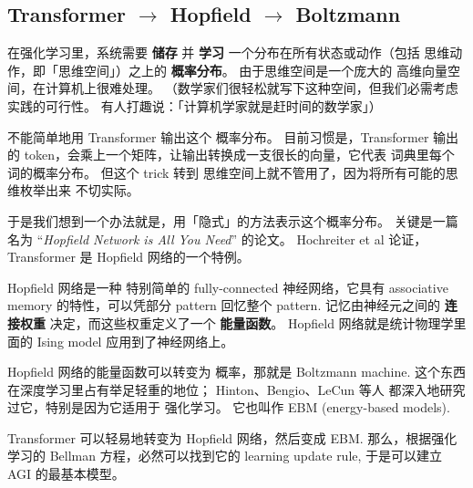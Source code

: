 \begin{preview}
\begin{minipage}{\textwidth}
\subsection[Transformer]{Transformer $\rightarrow$ Hopfield $\rightarrow$ Boltzmann}

在强化学习里，系统需要 \textbf{储存} 并 \textbf{学习} 一个分布在所有状态或动作（包括 思维动作，即「思维空间」）之上的 \textbf{概率分布}。 由于思维空间是一个庞大的 高维向量空间，在计算机上很难处理。 （数学家们很轻松就写下这种空间，但我们必需考虑实践的可行性。 有人打趣说：「计算机学家就是赶时间的数学家」）

不能简单地用 Transformer 输出这个 概率分布。 目前习惯是，Transformer 输出的 token，会乘上一个矩阵，让输出转换成一支很长的向量，它代表 词典里每个词的概率分布。 但这个 trick 转到 思维空间上就不管用了，因为将所有可能的思维枚举出来 不切实际。

于是我们想到一个办法就是，用「隐式」的方法表示这个概率分布。 关键是一篇名为 “\textit{Hopfield Network is All You Need}” 的论文。 Hochreiter et al 论证，Transformer 是 Hopfield 网络的一个特例。

Hopfield 网络是一种 特别简单的 fully-connected 神经网络，它具有 associative memory 的特性，可以凭部分 pattern 回忆整个 pattern. 记忆由神经元之间的 \textbf{连接权重} 决定，而这些权重定义了一个 \textbf{能量函数}。 Hopfield 网络就是统计物理学里面的 Ising model 应用到了神经网络上。 

Hopfield 网络的能量函数可以转变为 概率，那就是 Boltzmann machine.  这个东西在深度学习里占有举足轻重的地位； Hinton、Bengio、LeCun 等人 都深入地研究过它，特别是因为它适用于 强化学习。 它也叫作 EBM (energy-based models).

Transformer 可以轻易地转变为 Hopfield 网络，然后变成 EBM.  那么，根据强化学习的 Bellman 方程，必然可以找到它的 learning update rule, 于是可以建立 AGI 的最基本模型。


\end{minipage}
\end{preview}
